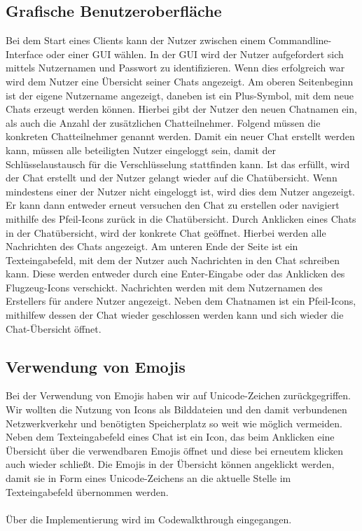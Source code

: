 
\author{Jan Grübener, Patrick Mischka}
\subsection{Grafische Benutzeroberfläche}

Bei dem Start eines Clients kann der Nutzer zwischen einem Commandline-Interface oder einer GUI wählen.
In der GUI wird der Nutzer aufgefordert sich mittels Nutzernamen und Passwort zu identifizieren. Wenn dies erfolgreich war wird dem Nutzer eine Übersicht seiner Chats angezeigt.
Am oberen Seitenbeginn ist der eigene Nutzername angezeigt, daneben ist ein Plus-Symbol, mit dem neue Chats erzeugt werden können. 
Hierbei gibt der Nutzer den neuen Chatnamen ein, als auch die Anzahl der zusätzlichen Chatteilnehmer. Folgend müssen die konkreten Chatteilnehmer genannt werden. 
Damit ein neuer Chat erstellt werden kann, müssen alle beteiligten Nutzer eingeloggt sein, damit der Schlüsselaustausch für die Verschlüsselung stattfinden kann.
Ist das erfüllt, wird der Chat erstellt und der Nutzer gelangt wieder auf die Chatübersicht. Wenn mindestens einer der Nutzer nicht eingeloggt ist, wird dies dem Nutzer angezeigt. Er kann dann entweder erneut versuchen den Chat zu erstellen oder navigiert mithilfe des Pfeil-Icons zurück in die Chatübersicht.
Durch Anklicken eines Chats in der Chatübersicht, wird der konkrete Chat geöffnet. Hierbei werden alle Nachrichten des Chats angezeigt. Am unteren Ende der Seite ist ein Texteingabefeld, mit dem der Nutzer auch Nachrichten in den Chat schreiben kann. Diese werden entweder durch eine Enter-Eingabe oder das Anklicken des Flugzeug-Icons verschickt. Nachrichten werden mit dem Nutzernamen des Erstellers für andere Nutzer angezeigt. 
Neben dem Chatnamen ist ein Pfeil-Icons, mithilfew dessen der Chat wieder geschlossen werden kann und sich wieder die Chat-Übersicht öffnet.

\author{Jan Grübener, Patrick Mischka}
\subsection{Verwendung von Emojis}

Bei der Verwendung von Emojis haben wir auf Unicode-Zeichen zurückgegriffen. 
Wir wollten die Nutzung von Icons als Bilddateien und den damit verbundenen Netzwerkverkehr und benötigten Speicherplatz so weit wie möglich vermeiden.
Neben dem Texteingabefeld eines Chat ist ein Icon, das beim Anklicken eine Übersicht über die verwendbaren Emojis öffnet und diese bei erneutem klicken auch wieder schließt. 
Die Emojis in der Übersicht können angeklickt werden, damit sie in Form eines Unicode-Zeichens an die aktuelle Stelle im Texteingabefeld übernommen werden.
\\ \\
Über die Implementierung wird im Codewalkthrough eingegangen.

